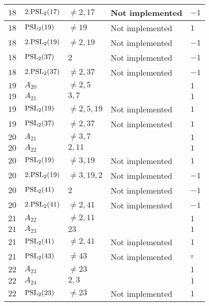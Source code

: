 \documentclass[a4paper, 11pt]{article}
\begin{document}
\begin{longtable}{lllll}
        $ 18 $ & $ 2.{\rm PSL}_{2}(17) $ & $ \neq 2, 17 $ & Not implemented & $ -1  $ \\ \hline
        $ 18 $ & $ {\rm PSL}_{2}(19) $ & $ \neq 19 $ & Not implemented & $ 1  $ \\ \hline
        $ 18 $ & $ 2.{\rm PSL}_{2}(19) $ & $ \neq 2, 19 $ & Not implemented & $ -1  $ \\ \hline
        $ 18 $ & $ {\rm PSL}_{2}(37) $ & $ 2 $ & Not implemented & $ -1  $ \\ \hline
        $ 18 $ & $ 2.{\rm PSL}_{2}(37) $ & $ \neq 2, 37 $ & Not implemented & $ -1  $ \\ \hline
        $ 19 $ & $ A_{20} $ & $ \neq 2, 5 $ & $ ~ $ & $ 1  $ \\ \hline
        $ 19 $ & $ A_{21} $ & $ 3, 7 $ & $ ~ $ & $ 1  $ \\ \hline
        $ 19 $ & $ {\rm PSL}_{2}(19) $ & $ \neq 2, 5, 19 $ & Not implemented & $ 1  $ \\ \hline
        $ 19 $ & $ {\rm PSL}_{2}(37) $ & $ \neq 2, 37 $ & Not implemented & $ 1  $ \\ \hline
        $ 20 $ & $ A_{21} $ & $ \neq 3, 7 $ & $ ~ $ & $ 1  $ \\ \hline
        $ 20 $ & $ A_{22} $ & $ 2, 11 $ & $ ~ $ & $ 1  $ \\ \hline
        $ 20 $ & $ {\rm PSL}_{2}(19) $ & $ \neq 3, 19 $ & Not implemented & $ 1  $ \\ \hline
        $ 20 $ & $ 2.{\rm PSL}_{2}(19) $ & $ \neq 3, 19, 2 $ & Not implemented & $ -1  $ \\ \hline
        $ 20 $ & $ {\rm PSL}_{2}(41) $ & $ 2 $ & Not implemented & $ -1  $ \\ \hline
        $ 20 $ & $ 2.{\rm PSL}_{2}(41) $ & $ \neq 2, 41 $ & Not implemented & $ -1  $ \\ \hline
        $ 21 $ & $ A_{22} $ & $ \neq 2, 11 $ & $ ~ $ & $ 1  $ \\ \hline
        $ 21 $ & $ A_{23} $ & $ 23 $ & $ ~ $ & $ 1  $ \\ \hline
        $ 21 $ & $ {\rm PSL}_{2}(41) $ & $ \neq 2, 41 $ & Not implemented & $ 1  $ \\ \hline
        $ 21 $ & $ {\rm PSL}_{2}(43) $ & $ \neq 43 $ & Not implemented & $\circ$ \\ \hline
        $ 22 $ & $ A_{23} $ & $ \neq 23 $ & $ ~ $ & $ 1  $ \\ \hline
        $ 22 $ & $ A_{24} $ & $ 2, 3 $ & $ ~ $ & $ 1  $ \\ \hline
        $ 22 $ & $ {\rm PSL}_{2}(23) $ & $ \neq 23 $ & Not implemented & $ 1  $ \\ \hline

\end{longtable}
\end{document}
